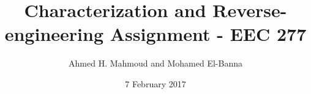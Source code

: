 \documentclass[12pt] {article}
\begin{document}
\title{Characterization and Reverse-engineering Assignment - EEC 277}
\author{Ahmed H. Mahmoud and Mohamed El-Banna}
\date{7 February 2017} 
\maketitle





\newpage






\end{document}
